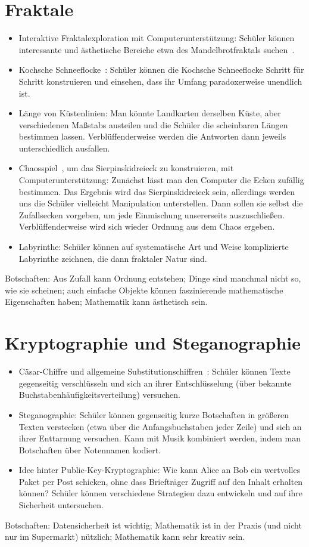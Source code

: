 \documentclass[a4paper,ngerman]{scrartcl}
\begin{document}
\section*{Fraktale}

\begin{itemize}
\item
Interaktive Fraktalexploration mit Computerunterstützung:
Schüler können interessante und ästhetische Bereiche etwa des
Mandelbrotfraktals suchen~\cite{fraktale}.
\item
Kochsche Schneeflocke~\cite{koch}: Schüler können die Kochsche Schneeflocke
Schritt für Schritt konstruieren und einsehen, dass ihr Umfang paradoxerweise
unendlich ist.
\item
Länge von Küstenlinien: Man könnte Landkarten derselben Küste, aber
verschiedenen Maßstabs austeilen und die Schüler die scheinbaren Längen
bestimmen lassen. Verblüffenderweise werden die Antworten dann jeweils
unterschiedlich ausfallen.
\item
Chaosspiel~\cite{chaosspiel}, um das Sierpinskidreieck zu konstruieren, mit
Com\-pu\-ter\-un\-ter\-stüt\-zung: Zunächst lässt man den Computer die Ecken zufällig
bestimmen. Das Ergebnis wird das Sierpinskidreieck sein, allerdings werden
uns die Schüler vielleicht Manipulation unterstellen. Dann sollen sie selbst
die Zufallsecken vorgeben, um jede Einmischung unsererseits auszuschließen.
Verblüffenderweise wird sich wieder Ordnung aus dem Chaos ergeben.
\item Labyrinthe: Schüler können auf systematische Art und Weise komplizierte
Labyrinthe zeichnen, die dann fraktaler Natur sind.
\end{itemize}
Botschaften: Aus Zufall kann Ordnung entstehen; Dinge sind manchmal nicht so,
wie sie scheinen; auch einfache Objekte können faszinierende mathematische
Eigenschaften haben; Mathematik kann ästhetisch sein.


\section*{Kryptographie und Steganographie}

\begin{itemize}
\item Cäsar-Chiffre und allgemeine Substitutionschiffren~\cite{subst}: Schüler können Texte
gegenseitig verschlüsseln und sich an ihrer Entschlüsselung (über bekannte
Buchstabenhäufigkeitsverteilung) versuchen.
\item Steganographie: Schüler können gegenseitig kurze Botschaften in größeren Texten
verstecken (etwa über die Anfangsbuchstaben jeder Zeile) und sich an ihrer Enttarnung
versuchen. Kann mit Musik kombiniert werden, indem man Botschaften über
Notennamen kodiert.
\item Idee hinter Public-Key-Kryptographie: Wie kann Alice an Bob ein
wertvolles Paket per Post schicken, ohne dass Briefträger Zugriff auf den
Inhalt erhalten können? Schüler können verschiedene Strategien dazu entwickeln
und auf ihre Sicherheit untersuchen.
\end{itemize}
Botschaften: Datensicherheit ist wichtig; Mathematik ist in der Praxis (und
nicht nur im Supermarkt) nützlich; Mathematik kann sehr kreativ sein.
\end{document}
